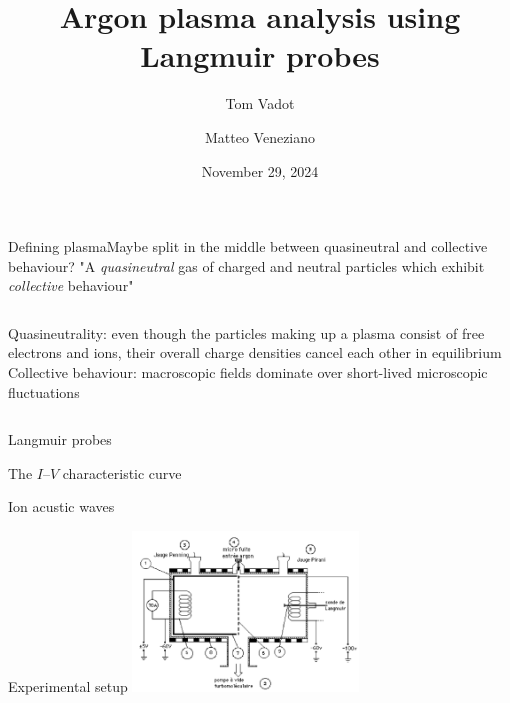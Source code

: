 \documentclass[10pt]{beamer}
\title[(À enlever)]{Argon plasma analysis using Langmuir probes}
\author[Tom Vadot \and Matteo Veneziano]{Tom Vadot \and Matteo Veneziano}
\institute[]{EPFL Section of Physics}
\date{November 29, 2024}
\begin{document}
\begin{frame}
    \titlepage
\end{frame}

\begin{frame}{Defining plasma}{Maybe split in the middle between quasineutral and collective behaviour?}
    "A \emph{quasineutral} gas of charged and neutral particles which exhibit \emph{collective} behaviour" 
    \begin{columns}
        Quasineutrality: even though the particles making up a plasma consist of free electrons and ions, their overall charge densities cancel each other in equilibrium 
        Collective behaviour: macroscopic fields dominate over short-lived microscopic fluctuations
    \end{columns}

\end{frame}


\begin{frame}{Langmuir probes}

\end{frame}


\begin{frame}{The $I$--$V$ characteristic curve}
    
\end{frame}


\begin{frame}{Ion acustic waves}
    
\end{frame}


\begin{frame}{Experimental setup}
    \includegraphics[width=6cm]{../figures/experimental-setup.png}
\end{frame}
\end{document}
